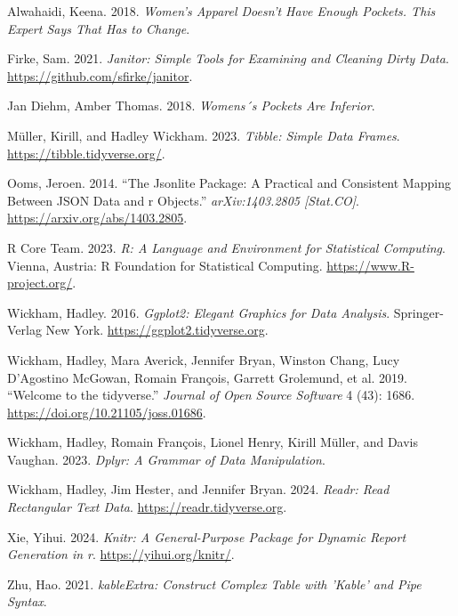 \documentclass[
  letterpaper,
  DIV=11,
  numbers=noendperiod]{scrartcl}
\newlength{\cslhangindent}
\newlength{\cslentryspacingunit} %
\newenvironment{CSLReferences}[2] %
 {%
  \setlength{\parindent}{0pt}
  \ifodd #1
  \let\oldpar\par
  \def\par{\hangindent=\cslhangindent\oldpar}
  \fi
  \setlength{\parskip}{#2\cslentryspacingunit}
 }%
 {}
\begin{document}
\hypertarget{refs}{}
\begin{CSLReferences}{1}{0}
\leavevmode{}%
Alwahaidi, Keena. 2018. \emph{Women's Apparel Doesn't Have Enough
Pockets. This Expert Says That Has to Change}.

\leavevmode{}%
Firke, Sam. 2021. \emph{Janitor: Simple Tools for Examining and Cleaning
Dirty Data}. \url{https://github.com/sfirke/janitor}.

\leavevmode{}%
Jan Diehm, Amber Thomas. 2018. \emph{Womens´s Pockets Are Inferior}.

\leavevmode{}%
Müller, Kirill, and Hadley Wickham. 2023. \emph{Tibble: Simple Data
Frames}. \url{https://tibble.tidyverse.org/}.

\leavevmode{}%
Ooms, Jeroen. 2014. {``The Jsonlite Package: A Practical and Consistent
Mapping Between JSON Data and r Objects.''} \emph{arXiv:1403.2805
{[}Stat.CO{]}}. \url{https://arxiv.org/abs/1403.2805}.

\leavevmode{}%
R Core Team. 2023. \emph{R: A Language and Environment for Statistical
Computing}. Vienna, Austria: R Foundation for Statistical Computing.
\url{https://www.R-project.org/}.

\leavevmode{}%
Wickham, Hadley. 2016. \emph{Ggplot2: Elegant Graphics for Data
Analysis}. Springer-Verlag New York.
\url{https://ggplot2.tidyverse.org}.

\leavevmode{}%
Wickham, Hadley, Mara Averick, Jennifer Bryan, Winston Chang, Lucy
D'Agostino McGowan, Romain François, Garrett Grolemund, et al. 2019.
{``Welcome to the {tidyverse}.''} \emph{Journal of Open Source Software}
4 (43): 1686. \url{https://doi.org/10.21105/joss.01686}.

\leavevmode{}%
Wickham, Hadley, Romain François, Lionel Henry, Kirill Müller, and Davis
Vaughan. 2023. \emph{Dplyr: A Grammar of Data Manipulation}.

\leavevmode{}%
Wickham, Hadley, Jim Hester, and Jennifer Bryan. 2024. \emph{Readr: Read
Rectangular Text Data}. \url{https://readr.tidyverse.org}.

\leavevmode{}%
Xie, Yihui. 2024. \emph{Knitr: A General-Purpose Package for Dynamic
Report Generation in r}. \url{https://yihui.org/knitr/}.

\leavevmode{}%
Zhu, Hao. 2021. \emph{kableExtra: Construct Complex Table with 'Kable'
and Pipe Syntax}.

\end{CSLReferences}
\end{document}
